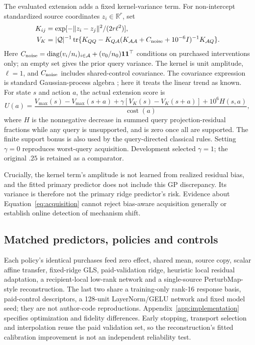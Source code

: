 The evaluated extension adds a fixed kernel-variance term. For non-intercept standardized source coordinates $z_i\in\mathbb R^r$, set
\begin{align}
 K_{ij}&=\exp[-\|z_i-z_j\|^2/(2r\ell^2)],\\
 V_K&=|\mathcal Q|^{-1}\operatorname{tr}\{K_{QQ}-K_{Q\mathcal A}(K_{\mathcal A\mathcal A}+C_{\rm noise}+10^{-6}I)^{-1}K_{\mathcal A Q}\}.
\end{align}
Here $C_{\rm noise}=\operatorname{diag}(v_i/n_i)_{i\in\mathcal A}+(v_0/n_0)\mathbf1\mathbf1^\top$ conditions on purchased interventions only; an empty set gives the prior query variance. The kernel is unit amplitude, $\ell=1$, and $C_{\rm noise}$ includes shared-control covariance. The covariance expression is standard Gaussian-process algebra \citep{gpml2006}; here it treats the linear trend as known. For state $s$ and action $a$, the actual extension score is
\begin{equation}
 U(a)=\frac{V_{\max}(s)-V_{\max}(s+a)+\gamma[V_K(s)-V_K(s+a)]+10^6 H(s,a)}{\operatorname{cost}(a)},
 \label{eq:acquisition}
\end{equation}
where $H$ is the nonnegative decrease in summed query projection-residual fractions while any query is unsupported, and is zero once all are supported. The finite support bonus is also used by the query-directed classical rules. Setting $\gamma=0$ reproduces worst-query acquisition. Development selected $\gamma=1$; the original $.25$ is retained as a comparator.

Crucially, the kernel term's amplitude is not learned from realized residual bias, and the fitted primary predictor does not include this GP discrepancy. Its variance is therefore not the primary ridge predictor's risk. Evidence about Equation~\ref{eq:acquisition} cannot reject bias-aware acquisition generally or establish online detection of mechanism shift.

\subsection{Matched predictors, policies and controls}
Each policy's identical purchases feed zero effect, shared mean, source copy, scalar affine transfer, fixed-ridge GLS, paid-validation ridge, heuristic local residual adaptation, a recipient-local low-rank network and a single-source PerturbMap-style reconstruction. The last two share a training-only rank-16 response basis, paid-control descriptors, a 128-unit LayerNorm/GELU network and fixed model seed; they are not author-code reproductions. Appendix~\ref{app:implementation} specifies optimization and fidelity differences. Early stopping, transport selection and interpolation reuse the paid validation set, so the reconstruction's fitted calibration improvement is not an independent reliability test.

